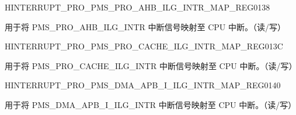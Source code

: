 \begin{register}{H}{INTERRUPT\_PRO\_PMS\_PRO\_AHB\_ILG\_INTR\_MAP\_REG}{\hexprefix{}0138}\label{regdesc:INTERRUPTPROPMSPROAHBILGINTRMAPREG}
%
%
\regnewline%
\begin{regdesc}\begin{reglist}
\label{fielddesc:INTERRUPTPROPMSPROAHBILGINTRMAP}\item [INTERRUPT\_PRO\_PMS\_PRO\_AHB\_ILG\_INTR\_MAP] 用于将 PMS\_PRO\_AHB\_ILG\_INTR 中断信号映射至 CPU 中断。（读/写）
\end{reglist}\end{regdesc}
\end{register}


\begin{register}{H}{INTERRUPT\_PRO\_PMS\_PRO\_CACHE\_ILG\_INTR\_MAP\_REG}{\hexprefix{}013C}\label{regdesc:INTERRUPTPROPMSPROCACHEILGINTRMAPREG}
%
%
\regnewline%
\begin{regdesc}\begin{reglist}
\label{fielddesc:INTERRUPTPROPMSPROCACHEILGINTRMAP}\item [INTERRUPT\_PRO\_PMS\_PRO\_CACHE\_ILG\_INTR\_MAP] 用于将 PMS\_PRO\_CACHE\_ILG\_INTR 中断信号映射至 CPU 中断。（读/写）
\end{reglist}\end{regdesc}
\end{register}


\begin{register}{H}{INTERRUPT\_PRO\_PMS\_DMA\_APB\_I\_ILG\_INTR\_MAP\_REG}{\hexprefix{}0140}\label{regdesc:INTERRUPTPROPMSDMAAPBIILGINTRMAPREG}
%
%
\regnewline%
\begin{regdesc}\begin{reglist}
\label{fielddesc:INTERRUPTPROPMSDMAAPBIILGINTRMAP}\item [INTERRUPT\_PRO\_PMS\_DMA\_APB\_I\_ILG\_INTR\_MAP] 用于将 PMS\_DMA\_APB\_I\_ILG\_INTR 中断信号映射至 CPU 中断。（读/写）
\end{reglist}\end{regdesc}
\end{register}


